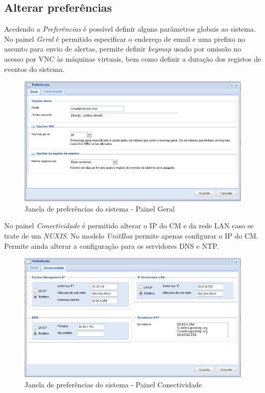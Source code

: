\subsection{Alterar preferências}
Acedendo a \emph{Preferências} é possível definir alguns parâmetros globais ao sistema.
No painel \emph{Geral} é permitido especificar o endereço de email e uma prefixo no assunto para envio de alertas, permite definir \emph{keymap} usado por omissão no acesso por VNC às máquinas virtuais, bem como definir a duração dos registos de eventos do sistema.

\begin{figure}[H]
        \begin{center}
        \includegraphics[scale=0.5]{screenshots/preferences_general.png}
        \caption{Janela de preferências do sistema - Painel Geral}
        \label{fig:preferences_general}
        \end{center}
\end{figure}

No painel \emph{Conectividade} é permitido alterar o IP do CM e da rede LAN caso se trate de um \emph{NUXIS}. No modelo \emph{UnitBox} permite apenas configurar o IP do CM.
Permite ainda alterar a configuração para os servidores DNS e NTP.

\begin{figure}[H]
        \begin{center}
        \includegraphics[scale=0.5]{screenshots/preferences_conn.png}
        \caption{Janela de preferências do sistema - Painel Conectividade}
        \label{fig:preferences_conn}
        \end{center}
\end{figure}

